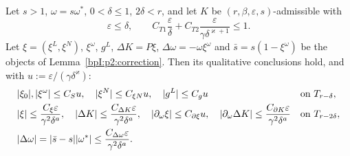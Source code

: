 \begin{lemma}\label{bpI:p2s:correction}
Let $s>1$, $\omega=s\omega^*$, $0<\delta\le1$, $2\delta<r$, and let $K$ be $(r,\beta,\varepsilon,s)$-admissible with
\[
\varepsilon\le\delta,\qquad C_{T1}\frac\varepsilon\delta+C_{T2}\frac\varepsilon{\gamma\delta^{\varkappa+1}}\le1.
\]
Let $\xi=(\xi^L,\xi^N)$, $\xi^\omega$, $g^L$, $\Delta K=P\xi$, $\Delta\omega=-\omega\xi^\omega$ and $\bar s=s(1-\xi^\omega)$ be the objects of
Lemma~\ref{bpI:p2:correction}. Then its qualitative conclusions hold, and with $u:=\varepsilon/(\gamma\delta^\varkappa)$:
\begin{align*}
&\lvert \xi_0\rvert,\lvert \xi^\omega\rvert\le C_Su,\quad\lvert \xi^N\rvert\le C_{\xi N}u,\quad\lvert g^L\rvert\le C_gu&&\text{on }T_{r-\delta},\\
&\lvert \xi\rvert\le\frac{C_\xi\varepsilon}{\gamma^2\delta^a},\quad\lvert \Delta K\rvert\le\frac{C_{\Delta K}\varepsilon}{\gamma^2\delta^a},\quad\lvert \partial_\omega\xi\rvert\le C_{\partial\xi}u,\quad
\lvert \partial_\omega\Delta K\rvert\le\frac{C_{\partial K}\varepsilon}{\gamma^2\delta^a}&&\text{on }T_{r-2\delta},\\
&\lvert \Delta\omega\rvert=\lvert \bar s-s\rvert\lvert \omega^*\rvert\le\frac{C_{\Delta\omega}\varepsilon}{\gamma^2\delta^a}.
\end{align*}
\end{lemma}

